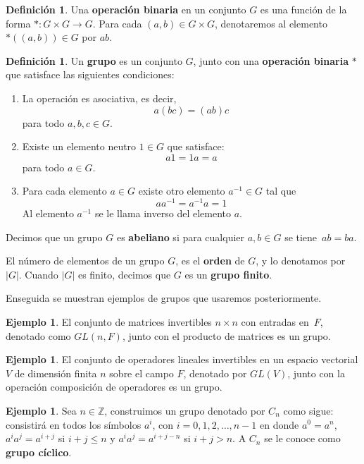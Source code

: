 \documentclass[12pt]{book}
\theoremstyle{definition}
\newtheorem{definition}[theorem]{Definición}
\newtheorem{example}[theorem]{Ejemplo}
\newcounter{in}
\newcounter{ini}
\begin{document}
\begin{definition}
  Una \textbf{operación binaria} en un conjunto $G$ es una función
  de la forma $*:G  \times G \rightarrow G$. Para cada $(a,b)\in G
  \times G$, denotaremos al elemento~$*((a,b))\in G$ por $ab$. 
\end{definition} 

\begin{definition} 
  Un \textbf{grupo} es un conjunto $G$, junto con una
  \textbf{operación binaria} $*$ que satisface las siguientes condiciones:
    \begin{enumerate}
    \item La operación es asociativa, es decir, $$a(bc)=(ab)c$$ para todo $a,b,c \in G$.
    \item Existe un elemento neutro $1 \in G$ que
      satisface: $$a1=1a=a$$ para todo $a \in G$.
    \item Para cada elemento $a \in G$ existe otro elemento $a^{-1} \in G$
      tal que $$aa^{-1}=a^{-1}a=1$$ Al elemento $a^{-1}$ se le llama inverso del elemento $a$.
    \end{enumerate}

    Decimos que un grupo $G$ es \textbf{abeliano} si para cualquier
    $a,b\in G$ se tiene~$ab=ba$.
\end{definition}
El número de elementos de un grupo $G$, es el \textbf{orden} de $G$, y
lo denotamos por $|G|$. Cuando $|G|$ es finito, decimos que $G$ es un
\textbf{grupo finito}.

Enseguida se muestran ejemplos de grupos que usaremos posteriormente.
\begin{example}
  \label{GL(nF)}
  El conjunto de matrices invertibles $n \times n$ con
  entradas en~$F$, denotado como $GL(n,F)$, junto con el producto de matrices es un grupo.  
\end{example}

\begin{example}
  \label{GL(V)}
  El conjunto de operadores lineales invertibles en un espacio vectorial $V$ de dimensión finita
  $n$ sobre el campo $F$, denotado por $GL(V)$, junto con la
  operación composición de operadores es un grupo.
\end{example}

\begin{example}
  \label{grupo-ciclico}
  Sea $n\in \mathbb{Z}$, construimos un grupo denotado por $C_{n}$ como sigue: consistirá
  en todos los símbolos $a^{i}$, con $i=0,1,2,\dots,n-1$ en donde $a^{0}=a^{n}$, $a^{i}a^{j}=a^{i+j}$ si $i+j\leq n$ y
  $a^{i}a^{j}=a^{i+j-n}$ si $i+j>n$. A $C_{n}$ se le conoce como \textbf{grupo
    cíclico}.
\end{example}
\end{document}
